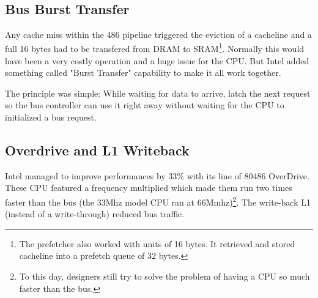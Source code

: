 \par
{}
\par
{}\\
\par




\subsection{Bus Burst Transfer}
Any cache miss within the 486 pipeline triggered the eviction of a cacheline and a full 16 bytes had to be transfered from DRAM to SRAM\footnote{The prefetcher also worked with units of 16 bytes. It retrieved and stored cacheline into a prefetch queue of 32 bytes.}. Normally this would have been a very costly operation and a huge issue for the CPU. But Intel added something called "Burst Transfer" capability to make it all work together.\\
\par
The principle was simple: While waiting for data to arrive, latch the next request so the bus controller can use it right away without waiting for the CPU to initialized a bus request.\\
\par
{}







\subsection{Overdrive and L1 Writeback}
Intel managed to improve performances by 33\% with its line of 80486 OverDrive. These CPU featured a frequency multiplied which made them run two times faster than the bus (the 33Mhz model CPU ran at 66Mmhz)\footnote{To this day, designers still try to solve the problem of having a CPU so much faster than the bus.}.  The write-back L1 (instead of a write-through) reduced bus traffic.\\
\par 
{}%
\par

